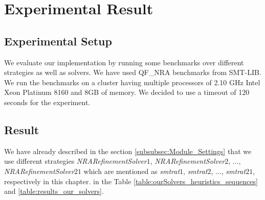 \chapter{Experimental Result}
\label{chap:experimental_result}

\section{Experimental Setup}
We evaluate our implementation by running some benchmarks over different strategies as well as solvers.
We have used QF\_NRA benchmarks from SMT-LIB.
We run the benchmarks on a cluster having multiple processors of 2.10 GHz Intel Xeon Platinum 8160 and 8GB of memory.
We decided to use a timeout of 120 seconds for the experiment.

\section{Result}
We have already described in the section \ref{subsubsec:Module_Settings} that we use different strategies \textit{NRARefinementSolver$1$}, \textit{NRARefinementSolver$2$}, $\dots$, \textit{NRARefinementSolver$21$} which are mentioned as  \textit{smtrat$1$}, \textit{smtrat$2$}, $\dots$, \textit{smtrat$21$}, respectively in this chapter. 
in the Table \ref{table:ourSolvers_heuristics_sequences} and \ref{table:results_our_solvers}.



